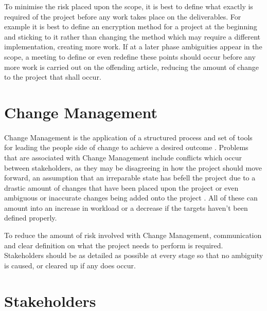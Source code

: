 To minimise the risk placed upon the scope, it is best to define what exactly is
required of the project before any work takes place on the deliverables.  For
example it is best to define an encryption method for a project at the beginning
and sticking to it rather than changing the method which may require a different
implementation, creating more work.  If at a later phase ambiguities appear in
the scope, a meeting to define or even redefine these points should occur before
any more work is carried out on the offending article, reducing the amount of
change to the project that shall occur.

\section{Change Management}
\paragraph{}

Change Management is the application of a structured process and set of tools
for leading the people side of change to achieve a desired outcome
\cite{changeManDef}.  Problems that are associated with Change Management
include conflicts which occur between stakeholders, as they may be
disagreeing in how the project should move forward, an assumption that an
irreparable state has befell the project due to a drastic amount of changes that
have been placed upon the project or even ambiguous or inaccurate changes being
added onto the project \cite{RiskList}.  All of these can amount into an
increase in workload or a decrease if the targets haven't been defined properly.

To reduce the amount of risk involved with Change Management, communication and
clear definition on what the project needs to perform is required.  Stakeholders
should be as detailed as possible at every stage so that no ambiguity is caused,
or cleared up if any does occur.

\section{Stakeholders}
\paragraph{}

